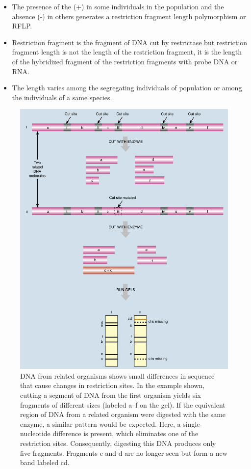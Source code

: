 \documentclass[11pt,dvipsnames,ignorenonframetext,aspectratio=169]{beamer}
\providecommand{\tightlist}{%
  \setlength{\itemsep}{0pt}\setlength{\parskip}{0pt}}
\begin{document}
\begin{frame}{}
\protect\hypertarget{section-25}{}
\begin{itemize}
\tightlist
\item
  The presence of the (+) in some individuals in the population and the
  absence (-) in others generates a restriction fragment length
  polymorphism or RFLP.
\item
  Restriction fragment is the fragment of DNA cut by restrictase but
  restriction fragment length is not the length of the restriction
  fragment, it is the length of the hybridized fragment of the
  restriction fragments with probe DNA or RNA.
\item
  The length varies among the segregating individuals of population or
  among the individuals of a same species.
\end{itemize}
\end{frame}

\begin{frame}{}
\protect\hypertarget{section-26}{}
\begin{figure}
\includegraphics[width=0.35\linewidth]{./../images/rflp_analysis} \caption{DNA from related organisms shows small differences in sequence that cause changes in restriction sites. In the example shown, cutting a segment of DNA from the first organism yields six fragments of different sizes (labeled a–f on the gel). If the equivalent region of DNA from a related organism were digested with the same enzyme, a similar pattern would be expected. Here, a single-nucleotide difference is present, which eliminates one of the restriction sites. Consequently, digesting this DNA produces only five fragments. Fragments c and d are no longer seen but form a new band labeled cd.}\label{fig:rflp-analysis}
\end{figure}
\end{frame}
\end{document}
